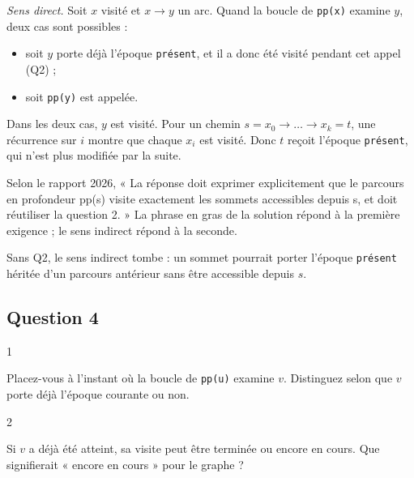 \documentclass[11pt,a4paper]{article}
\providecommand{\tightlist}{\setlength{\itemsep}{0pt}\setlength{\parskip}{0pt}}
\newcommand{\equationajustee}[1]{%
  \sbox{\boiteequation}{$\displaystyle #1$}%
  \ifdim\wd\boiteequation>\linewidth
    \[\resizebox{\linewidth}{!}{\usebox{\boiteequation}}\]%
  \else
    \[#1\]%
  \fi}
\begin{document}
\emph{Sens direct.} Soit \(x\) visité et \(x\to y\) un arc. Quand la boucle de \texttt{pp(x)} examine \(y\), deux cas sont possibles :

\begin{itemize}
\tightlist
\item
  soit \(y\) porte déjà l'époque \texttt{présent}, et il a donc été visité pendant cet appel (Q2) ;
\item
  soit \texttt{pp(y)} est appelée.
\end{itemize}

Dans les deux cas, \(y\) est visité. Pour un chemin \(s=x_0\to\dots\to x_k=t\), une récurrence sur \(i\) montre que chaque \(x_i\) est visité. Donc \(t\) reçoit l'époque \texttt{présent}, qui n'est plus modifiée par la suite.

\equationajustee{\boxed{\ s\rightsquigarrow t\iff \texttt{\text{époque}}[t]=\texttt{\text{présent}}\ }}

\begin{jury}

Selon le rapport 2026, « La réponse doit exprimer explicitement que le parcours en profondeur pp(s) visite exactement les sommets accessibles depuis s, et doit réutiliser la question 2. » La phrase en gras de la solution répond à la première exigence ; le sens indirect répond à la seconde.

\end{jury}

\begin{piege}

Sans Q2, le sens indirect tombe : un sommet pourrait porter l'époque \texttt{présent} héritée d'un parcours antérieur sans être accessible depuis \(s\).

\end{piege}

\hypertarget{question-4}{%
\subsection{Question 4}\label{question-4}}

\begin{indication}{1}

Placez-vous à l'instant où la boucle de \texttt{pp(u)} examine \(v\). Distinguez selon que \(v\) porte déjà l'époque courante ou non.

\end{indication}

\begin{indication}{2}

Si \(v\) a déjà été atteint, sa visite peut être terminée ou encore en cours. Que signifierait « encore en cours » pour le graphe ?

\end{indication}
\end{document}
